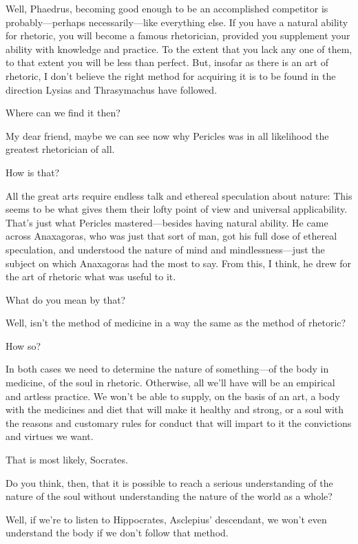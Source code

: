 \saysocrates Well, Phaedrus, becoming good enough to be an accomplished
competitor is probably---perhaps necessarily---like everything else. If
you have a natural ability for rhetoric, you will become a famous
rhetorician, provided you supplement your ability with knowledge and
practice. To the extent that you lack any one of them, to that extent
you will be less than perfect. But, insofar as there is an art of
rhetoric, I don't believe the right method for acquiring it is to be
found in the direction Lysias and Thrasymachus have followed.

\sayphaedrus Where can we find it then?

\saysocrates My dear friend, maybe we can see now why Pericles was
in all likelihood the greatest rhetorician of all.

\sayphaedrus How is that?

\saysocrates All the great arts require endless talk and
ethereal speculation about nature: This seems to be what gives them
their lofty point of view and universal applicability. That's just what
Pericles mastered---besides having natural ability. He came across
Anaxagoras, who was just that sort of man, got his full dose of ethereal
speculation, and understood the nature of mind and
mindlessness---just
the subject on which Anaxagoras had the most to say. From this, I think,
he drew for the art of rhetoric what was useful to it.

\sayphaedrus What do you mean by that?

\saysocrates Well, isn't the method of medicine in a way the same
as the method of rhetoric?

\sayphaedrus How so?

\saysocrates In both cases we need to determine the nature of
something---of the body in medicine, of the soul in rhetoric. Otherwise,
all we'll have will be an empirical and artless practice. We won't be
able to supply, on the basis of an art, a body with the medicines and
diet that will make it healthy and strong, or a soul with the reasons
and customary rules for conduct that will impart to it the convictions
and virtues we want.

\sayphaedrus That is most likely, Socrates.

\saysocrates Do you think, then, that it is possible to reach a serious
understanding of the nature of the soul without understanding
the nature of the world as a whole?

\sayphaedrus Well, if we're to listen to Hippocrates, Asclepius'
descendant, we won't
even understand the body if we don't follow that method.

